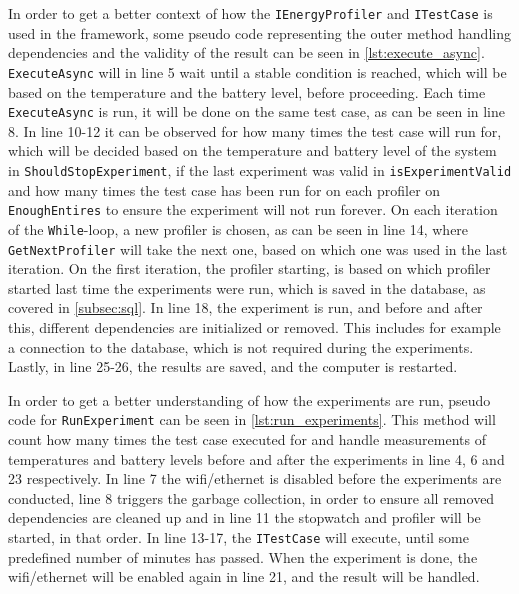 In order to get a better context of how the \texttt{IEnergyProfiler} and \texttt{ITestCase} is used in the framework, some pseudo code representing the outer method handling dependencies and the validity of the result can be seen in \cref*{lst:execute_async}. \texttt{ExecuteAsync} will in line 5 wait until a stable condition is reached, which will be based on the temperature and the battery level, before proceeding. Each time \texttt{ExecuteAsync} is run, it will be done on the same test case, as can be seen in line 8. In line 10-12 it can be observed for how many times the test case will run for, which will be decided based on the temperature and battery level of the system in \texttt{ShouldStopExperiment}, if the last experiment was valid in \texttt{isExperimentValid} and how many times the test case has been run for on each profiler on \texttt{EnoughEntires} to ensure the experiment will not run forever. On each iteration of the \texttt{While}-loop, a new profiler is chosen, as can be seen in line 14, where \texttt{GetNextProfiler} will take the next one, based on which one was used in the last iteration. On the first iteration, the profiler starting, is based on which profiler started last time the experiments were run, which is saved in the database, as covered in \cref{subsec:sql}. In line 18, the experiment is run, and before and after this, different dependencies are initialized or removed. This includes for example a connection to the database, which is not required during the experiments. Lastly, in line 25-26, the results are saved, and the computer is restarted. 



In order to get a better understanding of how the experiments are run, pseudo code for \texttt{RunExperiment} can be seen in \cref{lst:run_experiments}. This method will count how many times the test case executed for and handle measurements of temperatures and battery levels before and after the experiments in line 4, 6 and 23 respectively. In line 7 the wifi/ethernet is disabled before the experiments are conducted, line 8 triggers the garbage collection, in order to ensure all removed dependencies are cleaned up and in line 11 the stopwatch and profiler will be started, in that order. In line 13-17, the \texttt{ITestCase} will execute, until some predefined number of minutes has passed. When the experiment is done, the wifi/ethernet will be enabled again in line 21, and the result will be handled.





